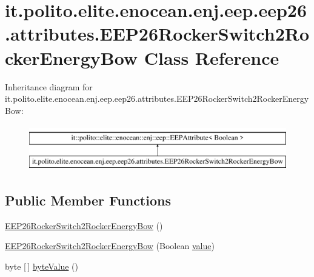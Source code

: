 \hypertarget{classit_1_1polito_1_1elite_1_1enocean_1_1enj_1_1eep_1_1eep26_1_1attributes_1_1_e_e_p26_rocker_switch2_rocker_energy_bow}{}\section{it.\+polito.\+elite.\+enocean.\+enj.\+eep.\+eep26.\+attributes.\+E\+E\+P26\+Rocker\+Switch2\+Rocker\+Energy\+Bow Class Reference}
\label{classit_1_1polito_1_1elite_1_1enocean_1_1enj_1_1eep_1_1eep26_1_1attributes_1_1_e_e_p26_rocker_switch2_rocker_energy_bow}
Inheritance diagram for it.\+polito.\+elite.\+enocean.\+enj.\+eep.\+eep26.\+attributes.\+E\+E\+P26\+Rocker\+Switch2\+Rocker\+Energy\+Bow\+:\begin{figure}[H]
\begin{center}
\leavevmode
\includegraphics[height=2.000000cm]{classit_1_1polito_1_1elite_1_1enocean_1_1enj_1_1eep_1_1eep26_1_1attributes_1_1_e_e_p26_rocker_switch2_rocker_energy_bow}
\end{center}
\end{figure}
\subsection*{Public Member Functions}
\begin{DoxyCompactItemize}
\item 
\hyperlink{classit_1_1polito_1_1elite_1_1enocean_1_1enj_1_1eep_1_1eep26_1_1attributes_1_1_e_e_p26_rocker_switch2_rocker_energy_bow_a9461692192cba9125f058d10d810667d}{E\+E\+P26\+Rocker\+Switch2\+Rocker\+Energy\+Bow} ()
\item 
\hyperlink{classit_1_1polito_1_1elite_1_1enocean_1_1enj_1_1eep_1_1eep26_1_1attributes_1_1_e_e_p26_rocker_switch2_rocker_energy_bow_a841bc5ba953b44525a34ff8633b8fac1}{E\+E\+P26\+Rocker\+Switch2\+Rocker\+Energy\+Bow} (Boolean \hyperlink{classit_1_1polito_1_1elite_1_1enocean_1_1enj_1_1eep_1_1_e_e_p_attribute_af4d7e34642004bb6ccfae51e925c983d}{value})
\item 
byte \mbox{[}$\,$\mbox{]} \hyperlink{classit_1_1polito_1_1elite_1_1enocean_1_1enj_1_1eep_1_1eep26_1_1attributes_1_1_e_e_p26_rocker_switch2_rocker_energy_bow_aac8e5ff710567d961f043b75988037e2}{byte\+Value} ()
\end{DoxyCompactItemize}
